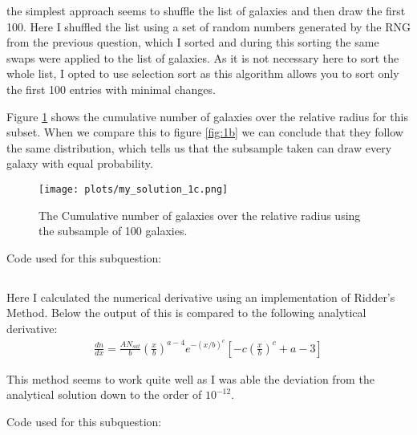 the simplest approach seems to shuffle the list of galaxies and then draw the first 100.
Here I shuffled the list using a set of random numbers generated by the RNG from the previous question, which I sorted and during this sorting the same swaps
were applied to the list of galaxies.
As it is not necessary here to sort the whole list, I opted to use selection sort as this algorithm allows you to sort only the first 100 entries with minimal changes.

Figure \ref{fig:1c} shows the cumulative number of galaxies over the relative radius for this subset. When we compare this to figure \ref{fig:1b} we can conclude that
they follow the same distribution, which tells us that the subsample taken can draw every galaxy with equal probability.
\begin{figure}[h]
    \centering
    \texttt{[image: plots/my\_solution\_1c.png]}
    \caption{The Cumulative number of galaxies over the relative radius using the subsample of 100 galaxies.}
    \label{fig:1c}
\end{figure}

Code used for this subquestion:


\subsection{}
Here I calculated the numerical derivative using an implementation of Ridder's Method.
Below the output of this is compared to the following analytical derivative:
\begin{align}
    \frac{d n}{d x} = \frac{A N_{sat}}{b} \left( \frac{x}{b} \right)^{a-4} e^{-(x/b)^c} \left[ -c \left( \frac{x}{b} \right)^c + a-3 \right]
\end{align}


This method seems to work quite well as I was able the deviation from the analytical solution down to the order of $10^{-12}$.

Code used for this subquestion:
